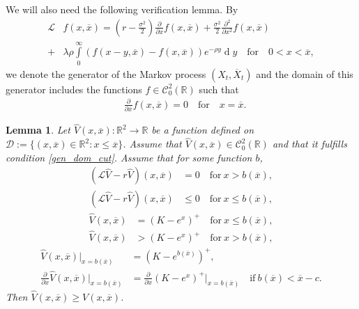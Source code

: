 \documentclass[10pt,a4paper]{amsart}
\newcommand{\dx}{\operatorname{d}\!}
\newtheorem{Lemma}{Lemma}
\begin{document}
	We will also need the following verification lemma.
	By
	\begin{align*}
		\mathcal{L}&f(x, \overline{x}) = \left(r - \frac{\sigma^2}{2}\right) \frac{\partial}{\partial x} f(x, \overline{x}) +  \frac{\sigma^2}{2}\frac{\partial^2}{\partial x^2} f(x, \overline{x})  \\
		+ & \lambda\rho\int\limits_0^\infty \left( f(x-y, \overline{x}) - f(x, \overline{x}) \right) e^{-\rho y}\dx y \quad \text{for}\quad 0 < x < \overline{x},
	\end{align*}
	we denote the generator of the Markov process $(X_t, \overline{X}_t)$
and the domain of this generator includes the functions $f\in \mathcal{C}^2_0(\mathbb{R})$ such that
	\begin{align}
		& \frac{\partial}{\partial \overline{x}} f(x, \overline{x})  =  0  \quad \text{for}\quad  x = \overline{x}. \label{gen_dom_cut}
	\end{align}	
	\begin{Lemma}\label{HJB}
		Let $\hat{V}(x, \overline{x}): \mathbb{R}^2 \rightarrow \mathbb{R}$ be a function defined on $\mathcal{D} := \{ (x, \overline{x}) \in \mathbb{R}^2 : x \leq \overline{x}\}$.
		Assume that $\hat{V}(x, \overline{x}) \in \mathcal{C}^2_0(\mathbb{R})$ and that it fulfills condition \eqref{gen_dom_cut}.
		Assume that for some function $b$,
		\begin{align}
			(\mathcal{L} \hat{V} - r\hat{V})(x, \overline{x}) &= 0\quad \text{for}\ x> b(\overline{x}), \label{HJB1} \\
			(\mathcal{L} \hat{V} - r\hat{V})(x, \overline{x}) &\leq 0\quad \text{for}\ x\leq  b(\overline{x}),\label{HJB1b}
		\end{align}
		\begin{align}
			\hat{V}(x, \overline{x}) &= (K - e^x)^+\quad \text{for}\ x \leq b(\overline{x}), \label{HJB3}\\
			\hat{V}(x, \overline{x}) &> (K - e^x)^+\quad \text{for}\ x> b(\overline{x}), \label{HJB4}
		\end{align}
		\begin{align}
			\hat{V}(x, \overline{x}) \big|_{x = b(\overline{x})} &= (K - e^{b(\overline{x})})^+, \label{HJB6}  \\
			\frac{\partial}{\partial x} \hat{V}(x, \overline{x}) \big|_{x = b(\overline{x})} &= \frac{\partial}{\partial x} (K - e^x)^+ \big|_{x = b(\overline{x})} \quad \text{if}\ b(\overline{x})<\overline{x}-c.\label{HJB7}
		\end{align}
		Then $\hat{V}(x, \overline{x})\geq V(x, \overline{x})$.
	\end{Lemma}
\end{document}
